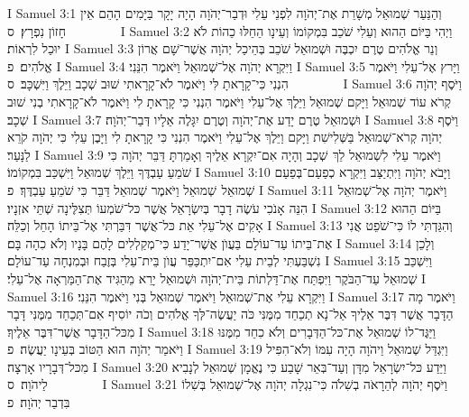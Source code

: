 I Samuel 3:1	וְהַנַּעַר שְׁמוּאֵל מְשָׁרֵת אֶת־יְהֹוָה לִפְנֵי עֵלִי וּדְבַר־יְהֹוָה הָיָה יָקָר בַּיָּמִים הָהֵם אֵין חָזוֹן נִפְרָץ׃ {ס}        
I Samuel 3:2	וַיְהִי בַּיּוֹם הַהוּא וְעֵלִי שֹׁכֵב בִּמְקוֹמוֹ וְעֵינָו הֵחֵלּוּ כֵהוֹת לֹא יוּכַל לִרְאוֹת׃
I Samuel 3:3	וְנֵר אֱלֹהִים טֶרֶם יִכְבֶּה וּשְׁמוּאֵל שֹׁכֵב בְּהֵיכַל יְהֹוָה אֲשֶׁר־שָׁם אֲרוֹן אֱלֹהִים׃ {פ}
I Samuel 3:4	וַיִּקְרָא יְהֹוָה אֶל־שְׁמוּאֵל וַיֹּאמֶר הִנֵּנִי׃
I Samuel 3:5	וַיָּרץ אֶל־עֵלִי וַיֹּאמֶר הִנְנִי כִּי־קָרָאתָ לִּי וַיֹּאמֶר לֹא־קָרָאתִי שׁוּב שְׁכָב וַיֵּלֶךְ וַיִּשְׁכָּב׃ {ס}        
I Samuel 3:6	וַיֹּסֶף יְהֹוָה קְרֹא עוֹד שְׁמוּאֵל וַיָּקם שְׁמוּאֵל וַיֵּלֶךְ אֶל־עֵלִי וַיֹּאמֶר הִנְנִי כִּי קָרָאתָ לִי וַיֹּאמֶר לֹא־קָרָאתִי בְנִי שׁוּב שְׁכָב׃
I Samuel 3:7	וּשְׁמוּאֵל טֶרֶם יָדַע אֶת־יְהֹוָה וְטֶרֶם יִגָּלֶה אֵלָיו דְּבַר־יְהֹוָה׃
I Samuel 3:8	וַיֹּסֶף יְהֹוָה קְרֹא־שְׁמוּאֵל בַּשְּׁלִישִׁת וַיָּקם וַיֵּלֶךְ אֶל־עֵלִי וַיֹּאמֶר הִנְנִי כִּי קָרָאתָ לִי וַיָּבֶן עֵלִי כִּי יְהֹוָה קֹרֵא לַנָּעַר׃
I Samuel 3:9	וַיֹּאמֶר עֵלִי לִשְׁמוּאֵל לֵךְ  שְׁכָב וְהָיָה אִם־יִקְרָא אֵלֶיךָ וְאָמַרְתָּ דַּבֵּר יְהֹוָה כִּי שֹׁמֵעַ עַבְדֶּךָ וַיֵּלֶךְ שְׁמוּאֵל וַיִּשְׁכַּב בִּמְקוֹמוֹ׃
I Samuel 3:10	וַיָּבֹא יְהֹוָה וַיִּתְיַצַּב וַיִּקְרָא כְפַעַם־בְּפַעַם שְׁמוּאֵל  שְׁמוּאֵל וַיֹּאמֶר שְׁמוּאֵל דַּבֵּר כִּי שֹׁמֵעַ עַבְדֶּךָ׃ {פ}
I Samuel 3:11	וַיֹּאמֶר יְהֹוָה אֶל־שְׁמוּאֵל הִנֵּה אָנֹכִי עֹשֶׂה דָבָר בְּיִשְׂרָאֵל אֲשֶׁר כּל־שֹׁמְעוֹ תְּצִלֶּינָה שְׁתֵּי אזְנָיו׃
I Samuel 3:12	בַּיּוֹם הַהוּא אָקִים אֶל־עֵלִי אֵת כּל־אֲשֶׁר דִּבַּרְתִּי אֶל־בֵּיתוֹ הָחֵל וְכַלֵּה׃
I Samuel 3:13	וְהִגַּדְתִּי לוֹ כִּי־שֹׁפֵט אֲנִי אֶת־בֵּיתוֹ עַד־עוֹלָם בַּעֲוֺן אֲשֶׁר־יָדַע כִּי־מְקַלְלִים לָהֶם בָּנָיו וְלֹא כִהָה בָּם׃
I Samuel 3:14	וְלָכֵן נִשְׁבַּעְתִּי לְבֵית עֵלִי אִם־יִתְכַּפֵּר עֲוֺן בֵּית־עֵלִי בְּזֶבַח וּבְמִנְחָה עַד־עוֹלָם׃
I Samuel 3:15	וַיִּשְׁכַּב שְׁמוּאֵל עַד־הַבֹּקֶר וַיִּפְתַּח אֶת־דַּלְתוֹת בֵּית־יְהֹוָה וּשְׁמוּאֵל יָרֵא מֵהַגִּיד אֶת־הַמַּרְאָה אֶל־עֵלִי׃
I Samuel 3:16	וַיִּקְרָא עֵלִי אֶת־שְׁמוּאֵל וַיֹּאמֶר שְׁמוּאֵל בְּנִי וַיֹּאמֶר הִנֵּנִי׃
I Samuel 3:17	וַיֹּאמֶר מָה הַדָּבָר אֲשֶׁר דִּבֶּר אֵלֶיךָ אַל־נָא תְכַחֵד מִמֶּנִּי כֹּה יַעֲשֶׂה־לְּךָ אֱלֹהִים וְכֹה יוֹסִיף אִם־תְּכַחֵד מִמֶּנִּי דָּבָר מִכּל־הַדָּבָר אֲשֶׁר־דִּבֶּר אֵלֶיךָ׃
I Samuel 3:18	וַיַּגֶּד־לוֹ שְׁמוּאֵל אֶת־כּל־הַדְּבָרִים וְלֹא כִחֵד מִמֶּנּוּ וַיֹּאמַר יְהֹוָה הוּא הַטּוֹב בְּעֵינָו יַעֲשֶׂה׃ {פ}
I Samuel 3:19	וַיִּגְדַּל שְׁמוּאֵל וַיהֹוָה הָיָה עִמּוֹ וְלֹא־הִפִּיל מִכּל־דְּבָרָיו אָרְצָה׃
I Samuel 3:20	וַיֵּדַע כּל־יִשְׂרָאֵל מִדָּן וְעַד־בְּאֵר שָׁבַע כִּי נֶאֱמָן שְׁמוּאֵל לְנָבִיא לַיהֹוָה׃ {ס}        
I Samuel 3:21	וַיֹּסֶף יְהֹוָה לְהֵרָאֹה בְשִׁלֹה כִּי־נִגְלָה יְהֹוָה אֶל־שְׁמוּאֵל בְּשִׁלוֹ בִּדְבַר יְהֹוָה׃ {פ}
